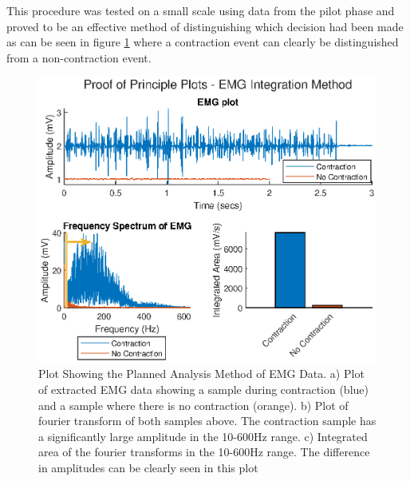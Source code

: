 This procedure was tested on a small scale using data from the pilot phase and proved to be an effective method of distinguishing which decision had been made as can be seen in figure \ref{fig:EMG_Proof_of_principal} where a contraction event can clearly be distinguished from a non-contraction event.
\begin{figure}[H]
    \centering
    \includegraphics[width=0.75\linewidth]{figures/EMG_Proof_Of_Principle.eps}
    \caption{Plot Showing the Planned Analysis Method of EMG Data. a) Plot of extracted EMG data showing a sample during contraction (blue) and a sample where there is no contraction (orange). b) Plot of fourier transform of both samples above. The contraction sample has a significantly large amplitude in the 10-600Hz range. c) Integrated area of the fourier transforms in the 10-600Hz range. The difference in amplitudes can be clearly seen in this plot}
    \label{fig:EMG_Proof_of_principal}
\end{figure}

